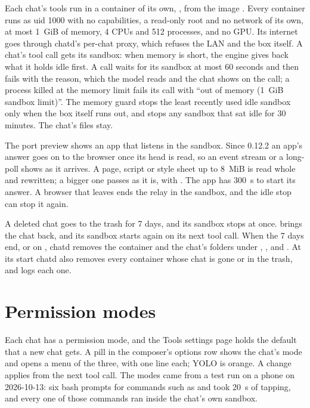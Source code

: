 Each chat's tools run in a container of its own, , from the image . Every container runs as uid 1000 with no capabilities, a read-only root and no network of its own, at most 1~GiB of memory, 4 CPUs and 512 processes, and no GPU. Its internet goes through chatd's per-chat proxy, which refuses the LAN and the box itself. A chat's tool call gets its sandbox: when memory is short, the engine gives back what it holds idle first. A call waits for its sandbox at most 60 seconds and then fails with the reason, which the model reads and the chat shows on the call; a process killed at the memory limit fails its call with ``out of memory (1~GiB sandbox limit)''. The memory guard stops the least recently used idle sandbox only when the box itself runs out, and stops any sandbox that sat idle for 30 minutes. The chat's files stay.

The port preview shows an app that listens in the sandbox. Since 0.12.2 an app's answer goes on to the browser once its head is read, so an event stream or a long-poll shows as it arrives. A page, script or style sheet up to 8~MiB is read whole and rewritten; a bigger one passes as it is, with . The app has 300~s to start its answer. A browser that leaves ends the relay in the sandbox, and the idle stop can stop it again.

A deleted chat goes to the trash for 7 days, and its sandbox stops at once.  brings the chat back, and its sandbox starts again on its next tool call. When the 7 days end, or on , chatd removes the container and the chat's folders under , ,  and . At its start chatd also removes every container whose chat is gone or in the trash, and logs each one.

\section{Permission modes}\label{sec:chat-modes}

Each chat has a permission mode, and the Tools settings page holds the default that a new chat gets. A pill in the composer's options row shows the chat's mode and opens a menu of the three, with one line each; YOLO is orange. A change applies from the next tool call. The modes came from a test run on a phone on 2026-10-13: six bash prompts for commands such as  and  took 20~s of tapping, and every one of those commands ran inside the chat's own sandbox.

